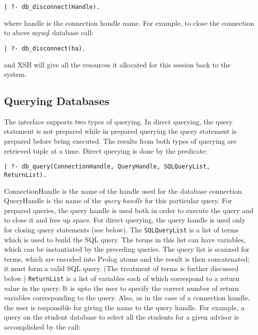 \begin{verbatim}
| ?- db_disconnect(Handle).
\end{verbatim}

\noindent
where handle is the connection handle name. For example, 
to close the connection to above mysql database call:

\begin{verbatim}
| ?- db_disconnect(ha).
\end{verbatim}

and XSB will give all the resources it allocated for this session back
to the system.


\subsection{Querying Databases}

The interface supports two types of querying. In direct querying, the
query statement is not prepared while in prepared querying the query
statement is prepared before being executed. The results from
both types of querying are retrieved tuple at a time.
Direct querying is done by the predicate:

\begin{verbatim}
| ?- db_query(ConnectionHandle, QueryHandle, SQLQueryList, ReturnList).
\end{verbatim}

ConnectionHandle is the name of the handle used for the database connection.
QueryHandle is the name of the \emph{query handle} for this particular query. 
For prepared queries, the query handle is used both in order to execute the
query and to close it and free up space. For direct querying,
the query handle is used only for closing query statements (see below).
The \texttt{SQLQueryList}  is a list of terms which is used to build the SQL query.
The terms in this list can have variables, which can be
instantiated by the preceding queries. The query list is scanned for terms,
which are encoded into Prolog atoms and the result is then concatenated;
it must form a valid SQL query. (The treatment of terms is further discussed
below.)
\texttt{ReturnList}  is a list of 
variables each of which correspond to a return value in the query.
It is upto the user to specify the correct number of return variables 
corresponding to the query. Also, as in the case of a connection handle, 
the user is responsible for giving the name to the query handle.
For example, a query on the student database to select all the students
for a given advisor is accomplished by the call:

